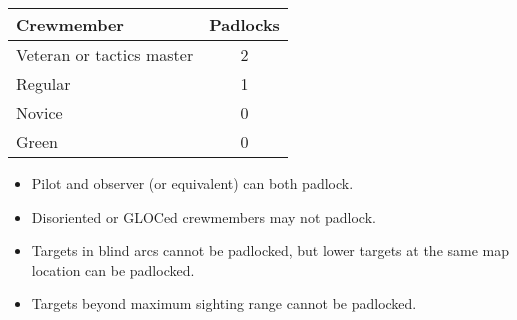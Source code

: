 {\begin{twocolumntablefloat}
\begin{twocolumntable}
\begin{multicols}{2}
\begin{onecolumntable}
\begin{tabularx}{0.7\linewidth}{Xc}
\toprule
Crewmember&Padlocks\\
\midrule
Veteran or tactics master&2\\
Regular&1\\
Novice&0\\
Green&0\\
\bottomrule
\end{tabularx}
\begin{tablenote}{0.7\linewidth}
\begin{itemize}
    \item Pilot and observer (or equivalent) can both padlock.
    \item Disoriented or GLOCed crewmembers may not padlock.
    \item Targets in blind arcs cannot be padlocked, but lower targets at the same map location can be padlocked.
    \item Targets beyond maximum sighting range cannot be padlocked.
\end{itemize}
\end{tablenote}
\end{onecolumntable}

\end{multicols}
\end{twocolumntable}
\end{twocolumntablefloat}




}
